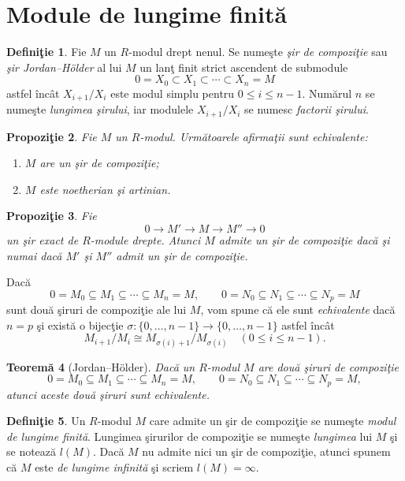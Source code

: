 \documentclass[12pt,a4paper]{book}
\theoremstyle{plain}
\newtheorem{theorem}{Teoremă}[section] %
\newtheorem{proposition}[theorem]{Propoziţie}
\theoremstyle{definition}
\newtheorem{definition}[theorem]{Definiţie}
\theoremstyle{remark}
\begin{document}
\section{Module de lungime finită}

\begin{definition}
Fie \(M\) un \(R\)-modul drept nenul. Se numeşte \emph{şir de compoziţie} sau
\emph{şir Jordan--Hölder} al lui \(M\) un lanţ finit strict ascendent de
submodule
\[
  0 = X_0 \subset X_1 \subset \cdots \subset X_n = M
\]
astfel încât \(X_{i+1}/X_i\) este modul simplu pentru \(0 \le i \le n-1\).
Numărul \(n\) se numeşte \emph{lungimea şirului}, iar modulele
\(X_{i+1}/X_i\) se numesc \emph{factorii şirului}.
\end{definition}

\begin{proposition}
Fie \(M\) un \(R\)-modul. Următoarele afirmaţii sunt echivalente:
\begin{enumerate}
  \item \(M\) are un şir de compoziţie;
  \item \(M\) este noetherian şi artinian.
\end{enumerate}
\end{proposition}

\begin{proposition}
Fie
\[
  0 \longrightarrow M' \longrightarrow M \longrightarrow M'' \longrightarrow 0
\]
un şir exact de \(R\)-module drepte. Atunci \(M\) admite un şir de compoziţie
dacă şi numai dacă \(M'\) şi \(M''\) admit un şir de compoziţie.
\end{proposition}

Dacă
\[
  0 = M_0 \subseteq M_1 \subseteq \cdots \subseteq M_n = M,\qquad
  0 = N_0 \subseteq N_1 \subseteq \cdots \subseteq N_p = M
\]
sunt două şiruri de compoziţie ale lui \(M\), vom spune că ele sunt
\emph{echivalente} dacă \(n=p\) şi există o bijecţie
\(\sigma : \{0,\ldots,n-1\} \to \{0,\ldots,n-1\}\) astfel încât
\[
  M_{i+1}/M_i \cong M_{\sigma(i)+1}/M_{\sigma(i)}
  \quad (0 \le i \le n-1).
\]

\begin{theorem}[Jordan--Hölder]
Dacă un \(R\)-modul \(M\) are două şiruri de compoziţie
\[
  0 = M_0 \subseteq M_1 \subseteq \cdots \subseteq M_n = M,\qquad
  0 = N_0 \subseteq N_1 \subseteq \cdots \subseteq N_p = M,
\]
atunci aceste două şiruri sunt echivalente.
\end{theorem}

\begin{definition}
Un \(R\)-modul \(M\) care admite un şir de compoziţie se numeşte
\emph{modul de lungime finită}. Lungimea şirurilor de compoziţie se
numeşte \emph{lungimea} lui \(M\) şi se notează \(l(M)\). Dacă \(M\)
nu admite nici un şir de com\-po\-zi\-ţie, atunci spunem că \(M\) este
\emph{de lungime infinită} şi scriem \(l(M)=\infty\).
\end{definition}
\end{document}
